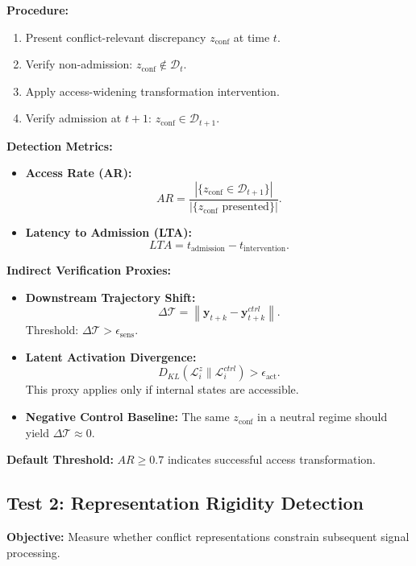 \documentclass[11pt,a4paper]{article}
\theoremstyle{breakstyle}
\newcommand{\Dadm}{\mathcal{D}}
\begin{document}
	\textbf{Procedure:}
	\begin{enumerate}
		\item Present conflict-relevant discrepancy $z_{\mathrm{conf}}$ at time $t$.
		\item Verify non-admission: $z_{\mathrm{conf}} \notin \Dadm_t$.
		\item Apply access-widening transformation intervention.
		\item Verify admission at $t+1$: $z_{\mathrm{conf}} \in \Dadm_{t+1}$.
	\end{enumerate}
	
	\textbf{Detection Metrics:}
	\begin{itemize}
		\item \textbf{Access Rate (AR):}
		\[
		AR =
		\frac{
			|\{z_{\mathrm{conf}} \in \Dadm_{t+1}\}|
		}{
			|\{z_{\mathrm{conf}} \text{ presented}\}|
		}.
		\]
		
		\item \textbf{Latency to Admission (LTA):}
		\[
		LTA = t_{\mathrm{admission}} - t_{\mathrm{intervention}}.
		\]
	\end{itemize}
	
	\textbf{Indirect Verification Proxies:}
	\begin{itemize}
		\item \textbf{Downstream Trajectory Shift:}
		\[
		\Delta \mathcal{T} =
		\left\|
		\mathbf{y}_{t+k} - \mathbf{y}^{ctrl}_{t+k}
		\right\|.
		\]
		Threshold: $\Delta \mathcal{T} > \epsilon_{\mathrm{sens}}$.
		
		\item \textbf{Latent Activation Divergence:}
		\[
		D_{KL}(\mathcal{L}^{z}_i \| \mathcal{L}^{ctrl}_i) > \epsilon_{\mathrm{act}}.
		\]
		This proxy applies only if internal states are accessible.
		
		\item \textbf{Negative Control Baseline:} The same $z_{\mathrm{conf}}$ in a neutral regime should yield $\Delta \mathcal{T} \approx 0$.
	\end{itemize}
	
	\textbf{Default Threshold:} $AR \geq 0.7$ indicates successful access transformation.
	
	\subsection*{Test 2: Representation Rigidity Detection}
	
	\textbf{Objective:} Measure whether conflict representations constrain subsequent signal processing.
	
\end{document}
